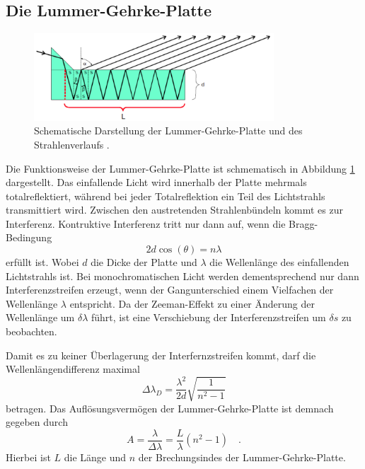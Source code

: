 \subsection*{Die Lummer-Gehrke-Platte}
\FloatBarrier
\begin{figure}
\centering
\includegraphics[width=0.8\textwidth]{dieguteGehrke.png}
\caption{Schematische Darstellung der Lummer-Gehrke-Platte und des Strahlenverlaufs \cite{quelle02}.}
\label{fig:tfig6}
\end{figure}
\FloatBarrier
Die Funktionsweise der Lummer-Gehrke-Platte ist schmematisch in Abbildung \ref{fig:tfig6} dargestellt. Das einfallende Licht wird innerhalb der Platte mehrmals totalreflektiert,
während bei jeder Totalreflektion ein Teil des Lichtstrahls transmittiert wird. Zwischen den austretenden Strahlenbündeln kommt es zur Interferenz. Kontruktive Interferenz tritt nur dann
auf, wenn die Bragg-Bedingung
\begin{equation}
2d \cos(\theta) = n \lambda
\end{equation}
erfüllt ist. Wobei $d$ die Dicke der Platte und $\lambda$ die Wellenlänge des einfallenden Lichtstrahls ist.
Bei monochromatischen Licht werden dementsprechend nur dann Interferenzstreifen erzeugt, wenn der Gangunterschied einem Vielfachen der Wellenlänge $\lambda$ entspricht. Da der Zeeman-Effekt zu einer 
Änderung der Wellenlänge um $\delta \lambda$ führt, ist eine Verschiebung der Interferenzstreifen um $\delta s$ zu beobachten.

Damit es zu keiner Überlagerung der Interfernzstreifen kommt, darf die Wellenlängendifferenz maximal
\begin{equation}
    \label{eq:lambda_d}
\Delta \lambda_D = \frac{\lambda ^2}{2d}\sqrt{\frac{1}{n^2-1}}
\end{equation}
betragen. Das Auflösungsvermögen der Lummer-Gehrke-Platte ist demnach gegeben durch
\begin{equation}
    \label{eq:a}
A = \frac{\lambda}{\Delta \lambda} = \frac{L}{\lambda}(n^2-1) \quad  .
\end{equation}
Hierbei ist $L$ die Länge und $n$ der Brechungsindes der Lummer-Gehrke-Platte.


